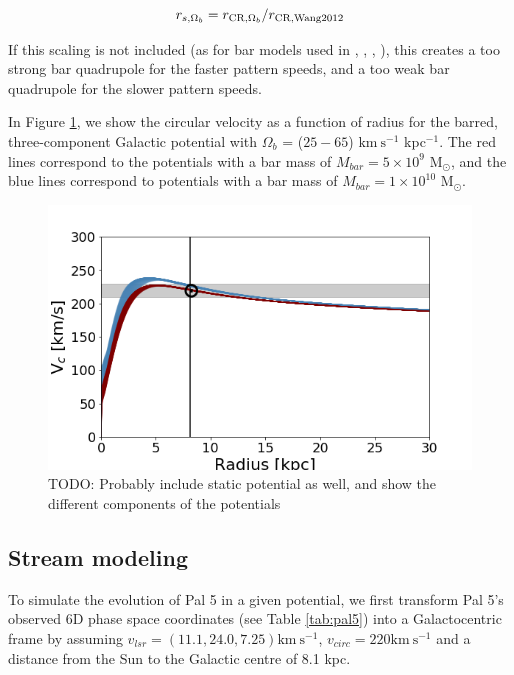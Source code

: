 \documentclass[modern]{aastex62}
\newcommand{\msun}{\textrm{M}_\odot}
\newcommand{\kms}{\ensuremath{\textrm{km}~\textrm{s}^{-1}}}
\newcommand{\todo}[1]{{\color{red} TODO: #1}}
\begin{document}
\begin{equation} 
r_{s, \Omega_b}  = r_{{\rm CR}, \Omega_b}/r_{{\rm CR, Wang 2012}}
\end{equation} 

If this scaling is not included (as for bar models used in \citealt{price:2016b}, \citealt{Pearson:2017}, \citealt{Erkal:2017}, \citealt{Banik:2019}), this creates a too strong bar quadrupole for the faster pattern speeds, and a too weak bar quadrupole for the slower pattern speeds. 

In Figure \ref{fig:vcirc}, we show the circular velocity as a function of radius for the barred, three-component Galactic potential with $\Omega_b$ = ($25 - 65$) $\kms$ kpc$^{-1}$. The red lines correspond to the potentials with a bar mass of $M_{bar} = 5 \times 10^{9}$ $\msun$, and the blue lines correspond to potentials with a bar mass of  $M_{bar} = 1 \times 10^{10}$ $\msun$.

\begin{figure}
\centerline{\includegraphics[width=\columnwidth]{v_circ_nlm919.png}}
\caption{\todo{Probably include static potential as well, and show the different components of the potentials }}
\label{fig:vcirc}
\end{figure}



\subsection{Stream modeling}
\label{sec:modeling}
To simulate the evolution of Pal 5 in a given potential, we first transform Pal 5's observed 6D phase space coordinates (see Table \ref{tab:pal5}) into a Galactocentric frame by assuming $v_{lsr} = (11.1, 24.0, 7.25) \kms$,  $v_{circ} = 220  \kms$ and a distance from the Sun to the Galactic centre of 8.1 kpc. 
\end{document}
